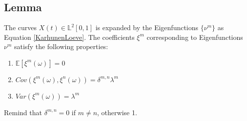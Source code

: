 \documentclass[11pt,twoside,a4paper]{article}
\begin{document}
	\subsection{Lemma} \label{Proof1}
	The curves $X(t) \in \mathbb{L}^2[0,1]$ is expanded by the Eigenfunctions $\{\nu^m\}$ as Equation \ref{KarhunenLoeve}. The coefficients $\xi^{m}$ corresponding to Eigenfunctions $\nu^m$ satisfy the following properties:
	
	\begin{multicols}{2}
		\begin{enumerate}
			\item $\mathbb{E}\left[\xi^m(\omega)\right] = 0$
			\item $Cov\left(\xi^m(\omega), \xi^n(\omega)\right) = \delta^{m,n}\lambda^m$%
			\item $Var\left(\xi^m(\omega)\right) = \lambda^m$
		\end{enumerate}
	\end{multicols}

	Remind that $\delta^{m,n} = 0$ if $m \neq n$, otherwise 1.
	
\end{document}
